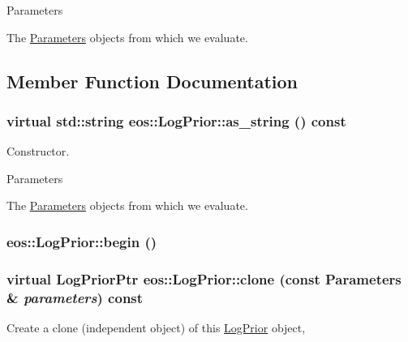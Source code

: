 \begin{DoxyParams}{Parameters}
\item[{\em parameters}]The \hyperlink{classeos_1_1Parameters}{Parameters} objects from which we evaluate. \end{DoxyParams}


\subsection{Member Function Documentation}
\hypertarget{classeos_1_1LogPrior_a3c6fe4377cbfdf51bf1472ef16272660}{
\subsubsection[{as\_\-string}]{\setlength{\rightskip}{0pt plus 5cm}virtual std::string eos::LogPrior::as\_\-string () const}}
\label{classeos_1_1LogPrior_a3c6fe4377cbfdf51bf1472ef16272660}
Constructor.


\begin{DoxyParams}{Parameters}
\item[{\em parameters}]The \hyperlink{classeos_1_1Parameters}{Parameters} objects from which we evaluate. \end{DoxyParams}
\hypertarget{classeos_1_1LogPrior_a50155394c200be97f25ef0e56973dbd8}{
\subsubsection[{begin}]{ eos::LogPrior::begin ()}}
\label{classeos_1_1LogPrior_a50155394c200be97f25ef0e56973dbd8}
\hypertarget{classeos_1_1LogPrior_abb48bbbc8034fc487403fee22265f2c8}{
\subsubsection[{clone}]{\setlength{\rightskip}{0pt plus 5cm}virtual {\bf LogPriorPtr} eos::LogPrior::clone (const {\bf Parameters} \& {\em parameters}) const}}
\label{classeos_1_1LogPrior_abb48bbbc8034fc487403fee22265f2c8}
Create a clone (independent object) of this \hyperlink{classeos_1_1LogPrior}{LogPrior} object,


